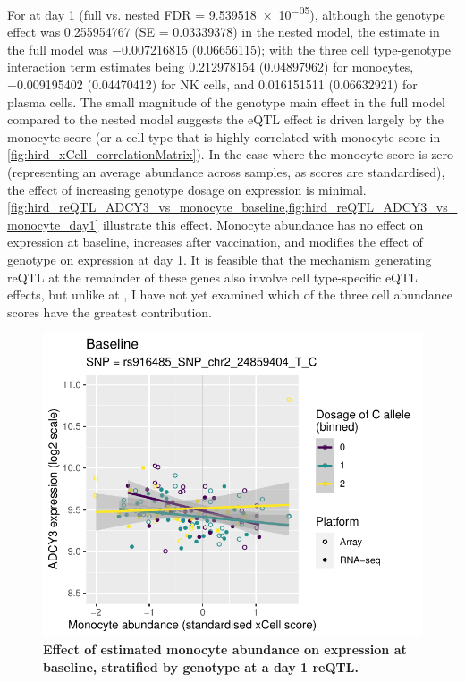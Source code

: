For  at day 1 (full vs. nested \gls{FDR} = \num{9.539518e-05}),
although the genotype effect was \num{0.255954767} (SE = \num{0.03339378}) in the nested model,
the estimate in the full model was \num{-0.007216815} (\num{0.06656115});
with the three cell type-genotype interaction term estimates being
\num{0.212978154} (\num{0.04897962}) for monocytes,
\num{-0.009195402} (\num{0.04470412}) for \gls{NK} cells,
and \num{0.016151511} (\num{0.06632921}) for plasma cells.
The small magnitude of the genotype main effect in the full model compared to the nested model suggests the \gls{eQTL} effect is driven largely by the monocyte score (or a cell type that is highly correlated with monocyte score in \cref{fig:hird_xCell_correlationMatrix}).
In the case where the monocyte score is zero (representing an average abundance across samples, as scores are standardised), the effect of increasing genotype dosage on  expression is minimal.
\cref{fig:hird_reQTL_ADCY3_vs_monocyte_baseline,fig:hird_reQTL_ADCY3_vs_monocyte_day1} illustrate this effect.
Monocyte abundance has no effect on expression at baseline, 
increases after vaccination, and modifies the effect of genotype on expression at day 1.
It is feasible that the mechanism generating \gls{reQTL} at the remainder of these genes also involve cell type-specific \gls{eQTL} effects, 
but unlike at , 
I have not yet examined which of the three cell abundance scores have the greatest contribution.

\begin{figure}
    \centering
    \includegraphics[width=1.0\textwidth,page=1]{mainmatter/figures/chapter_03/lme4qtl.ENSG00000138031_Monocyte_baseline.pdf}
    \caption{
        \textbf{Effect of estimated monocyte abundance on  expression at baseline, stratified by genotype at a day 1  \gls{reQTL}.}
    }
    \label{fig:hird_reQTL_ADCY3_vs_monocyte_baseline}
\end{figure}

